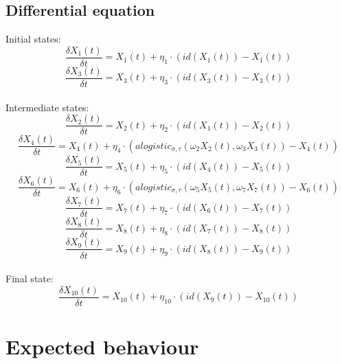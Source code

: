 \documentclass[a4paper]{article}
\begin{document}
\subsection{Differential equation}

Initial states:
\begin{equation}
\frac{\delta X_{1}(t)}{\delta t} = X_{1}(t) + \eta_{1} \cdot ( id(X_{1}(t)) - X_{1}(t))
\end{equation}
\begin{equation}
\frac{\delta X_{3}(t)}{\delta t} = X_{3}(t) + \eta_{3} \cdot ( id(X_{3}(t)) - X_{3}(t))
\end{equation}
\\
Intermediate states:
\begin{equation}
\frac{\delta X_{2}(t)}{\delta t} = X_{2}(t) + \eta_{2} \cdot ( id(X_{1}(t)) - X_{2}(t))
\end{equation}
\begin{equation}
\frac{\delta X_{4}(t)}{\delta t} = X_{4}(t) + \eta_{4} \cdot ( alogistic_{\sigma ,\tau}(\omega_{2} X_{2}(t),\omega_{3} X_{3}(t)) - X_{4}(t))
\end{equation}
\begin{equation}
\frac{\delta X_{5}(t)}{\delta t} = X_{5}(t) + \eta_{5} \cdot ( id(X_{4}(t)) - X_{5}(t))
\end{equation}
\begin{equation}
\frac{\delta X_{6}(t)}{\delta t} = X_{6}(t) + \eta_{6} \cdot (alogistic_{\sigma ,\tau}(\omega_{5} X_{5}(t),\omega_{7} X_{7}(t)) - X_{6}(t))
\end{equation}
\begin{equation}
\frac{\delta X_{7}(t)}{\delta t} = X_{7}(t) + \eta_{7} \cdot ( id(X_{6}(t)) - X_{7}(t))
\end{equation}
\begin{equation}
\frac{\delta X_{8}(t)}{\delta t} = X_{8}(t) + \eta_{8} \cdot ( id(X_{7}(t)) - X_{8}(t))
\end{equation}
\begin{equation}
\frac{\delta X_{9}(t)}{\delta t} = X_{9}(t) + \eta_{9} \cdot ( id(X_{8}(t)) - X_{9}(t))
\end{equation}
\\
Final state:
\begin{equation}
\frac{\delta X_{10}(t)}{\delta t} = X_{10}(t) + \eta_{10} \cdot ( id(X_{9}(t)) - X_{10}(t))
\end{equation}

\section{Expected behaviour}\label{sec:expected_behaviour}
\end{document}
